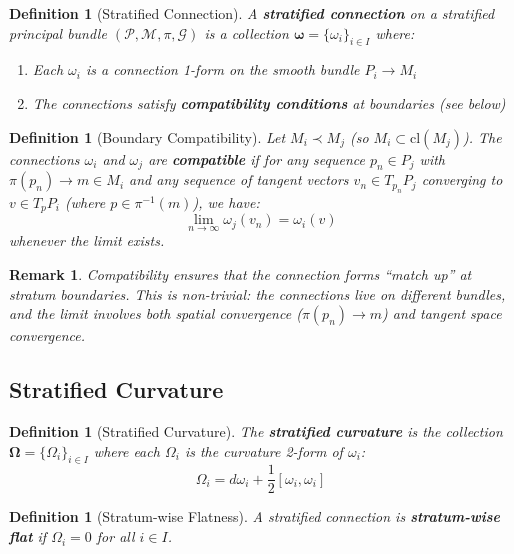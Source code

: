 \documentclass[11pt,a4paper]{article}
\newtheorem{definition}[theorem]{Definition}
\newtheorem{remark}[theorem]{Remark}
\begin{document}
\begin{definition}[Stratified Connection]
A \textbf{stratified connection} on a stratified principal bundle $(\mathcal{P}, \mathcal{M}, \pi, \mathcal{G})$ is a collection $\boldsymbol{\omega} = \{\omega_i\}_{i \in I}$ where:
\begin{enumerate}
    \item[(i)] Each $\omega_i$ is a connection 1-form on the smooth bundle $P_i \to M_i$
    \item[(ii)] The connections satisfy \textbf{compatibility conditions} at boundaries (see below)
\end{enumerate}
\end{definition}

\begin{definition}[Boundary Compatibility]
Let $M_i \prec M_j$ (so $M_i \subset \mathrm{cl}(M_j)$). The connections $\omega_i$ and $\omega_j$ are \textbf{compatible} if for any sequence $p_n \in P_j$ with $\pi(p_n) \to m \in M_i$ and any sequence of tangent vectors $v_n \in T_{p_n} P_j$ converging to $v \in T_p P_i$ (where $p \in \pi^{-1}(m)$), we have:
\[
    \lim_{n \to \infty} \omega_j(v_n) = \omega_i(v)
\]
whenever the limit exists.
\end{definition}

\begin{remark}
Compatibility ensures that the connection forms ``match up'' at stratum boundaries. This is non-trivial: the connections live on different bundles, and the limit involves both spatial convergence ($\pi(p_n) \to m$) and tangent space convergence.
\end{remark}

\subsection{Stratified Curvature}

\begin{definition}[Stratified Curvature]
The \textbf{stratified curvature} is the collection $\boldsymbol{\Omega} = \{\Omega_i\}_{i \in I}$ where each $\Omega_i$ is the curvature 2-form of $\omega_i$:
\[
    \Omega_i = d\omega_i + \frac{1}{2}[\omega_i, \omega_i]
\]
\end{definition}

\begin{definition}[Stratum-wise Flatness]
A stratified connection is \textbf{stratum-wise flat} if $\Omega_i = 0$ for all $i \in I$.
\end{definition}
\end{document}
